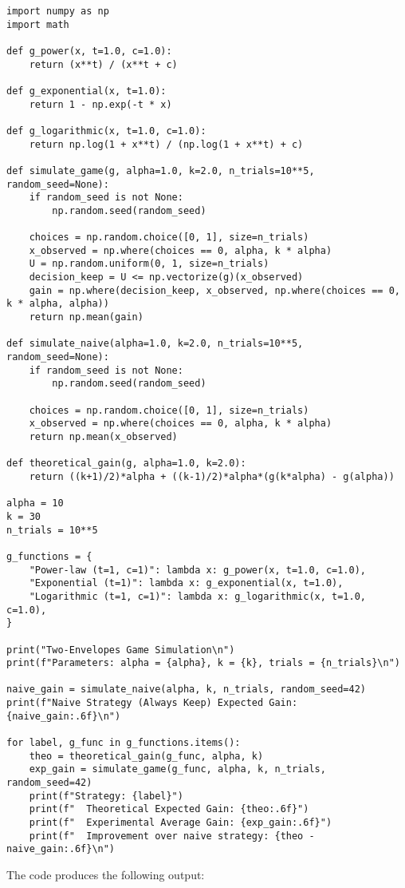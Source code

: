\documentclass[11pt, a4paper, oneside]{article}
\theoremstyle{remark}
\theoremstyle{lemma}
\begin{document}
\begin{lstlisting}
import numpy as np
import math

def g_power(x, t=1.0, c=1.0):
    return (x**t) / (x**t + c)

def g_exponential(x, t=1.0):
    return 1 - np.exp(-t * x)

def g_logarithmic(x, t=1.0, c=1.0):
    return np.log(1 + x**t) / (np.log(1 + x**t) + c)

def simulate_game(g, alpha=1.0, k=2.0, n_trials=10**5, random_seed=None):
    if random_seed is not None:
        np.random.seed(random_seed)
    
    choices = np.random.choice([0, 1], size=n_trials)
    x_observed = np.where(choices == 0, alpha, k * alpha)
    U = np.random.uniform(0, 1, size=n_trials)
    decision_keep = U <= np.vectorize(g)(x_observed)
    gain = np.where(decision_keep, x_observed, np.where(choices == 0, k * alpha, alpha))
    return np.mean(gain)

def simulate_naive(alpha=1.0, k=2.0, n_trials=10**5, random_seed=None):
    if random_seed is not None:
        np.random.seed(random_seed)
    
    choices = np.random.choice([0, 1], size=n_trials)
    x_observed = np.where(choices == 0, alpha, k * alpha)
    return np.mean(x_observed)

def theoretical_gain(g, alpha=1.0, k=2.0):
    return ((k+1)/2)*alpha + ((k-1)/2)*alpha*(g(k*alpha) - g(alpha))

alpha = 10
k = 30
n_trials = 10**5

g_functions = {
    "Power-law (t=1, c=1)": lambda x: g_power(x, t=1.0, c=1.0),
    "Exponential (t=1)": lambda x: g_exponential(x, t=1.0),
    "Logarithmic (t=1, c=1)": lambda x: g_logarithmic(x, t=1.0, c=1.0),
}

print("Two-Envelopes Game Simulation\n")
print(f"Parameters: alpha = {alpha}, k = {k}, trials = {n_trials}\n")

naive_gain = simulate_naive(alpha, k, n_trials, random_seed=42)
print(f"Naive Strategy (Always Keep) Expected Gain: {naive_gain:.6f}\n")

for label, g_func in g_functions.items():
    theo = theoretical_gain(g_func, alpha, k)
    exp_gain = simulate_game(g_func, alpha, k, n_trials, random_seed=42)
    print(f"Strategy: {label}")
    print(f"  Theoretical Expected Gain: {theo:.6f}")
    print(f"  Experimental Average Gain: {exp_gain:.6f}")
    print(f"  Improvement over naive strategy: {theo - naive_gain:.6f}\n")
\end{lstlisting}
The code produces the following output:
\end{document}

